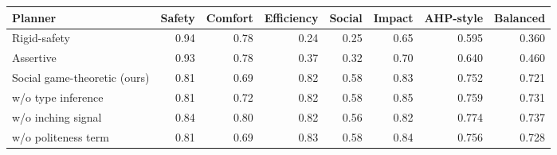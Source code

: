 \begin{tabular}{lrrrrrrr}
\toprule
Planner & Safety & Comfort & Efficiency & Social & Impact & AHP-style & Balanced \\
\midrule
Rigid-safety & 0.94 & 0.78 & 0.24 & 0.25 & 0.65 & 0.595 & 0.360 \\
Assertive & 0.93 & 0.78 & 0.37 & 0.32 & 0.70 & 0.640 & 0.460 \\
Social game-theoretic (ours) & 0.81 & 0.69 & 0.82 & 0.58 & 0.83 & 0.752 & 0.721 \\
\quad w/o type inference & 0.81 & 0.72 & 0.82 & 0.58 & 0.85 & 0.759 & 0.731 \\
\quad w/o inching signal & 0.84 & 0.80 & 0.82 & 0.56 & 0.82 & 0.774 & 0.737 \\
\quad w/o politeness term & 0.81 & 0.69 & 0.83 & 0.58 & 0.84 & 0.756 & 0.728 \\
\bottomrule
\end{tabular}
